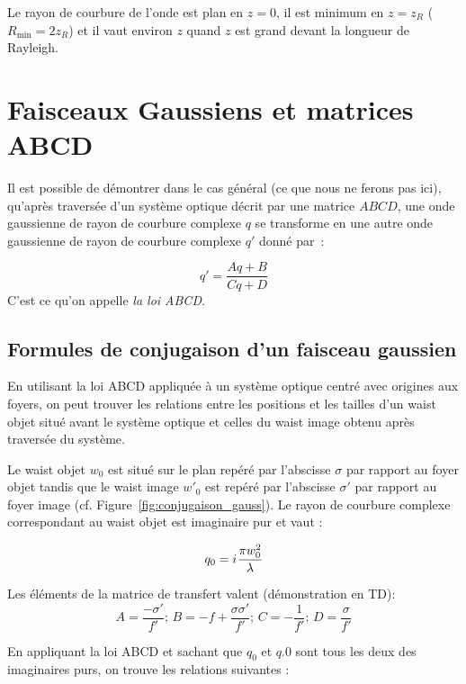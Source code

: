 \documentclass[a4paper]{book}
\newcommand{\iu}{{i\mkern1mu}}
\begin{document}
Le rayon de courbure de l'onde est plan en $z=0$, il est minimum en $z = z_R$ ($R_\textrm{min}=2z_R$) et il vaut environ $z$ quand $z$ est grand devant la longueur de Rayleigh.


\section{Faisceaux Gaussiens et matrices ABCD}

Il est possible de démontrer dans le cas général (ce que nous ne ferons pas ici), qu'après traversée d'un système optique décrit par une matrice $ABCD$, une onde gaussienne de rayon de courbure complexe $q$ se transforme en une autre onde gaussienne de rayon de courbure complexe $q'$ donné par~:

\begin{equation}
    q'=\frac{Aq+B}{Cq+D}
\end{equation}
C'est ce qu'on appelle \textit{la loi ABCD}.

\subsection{Formules de conjugaison d'un faisceau gaussien}

En utilisant la loi ABCD appliquée à un système optique centré avec origines aux foyers, on peut trouver les relations entre les positions et les tailles d'un waist objet situé avant le système optique et celles du waist image obtenu après traversée du système.


Le waist objet $w_0$ est situé sur le plan repéré par l'abscisse $\sigma$ par rapport au foyer objet tandis que le waist image $w'_0$ est repéré par l'abscisse $\sigma'$ par rapport au foyer image (cf. Figure~\ref{fig:conjugaison_gauss}). Le rayon de courbure complexe correspondant au waist objet est imaginaire pur et vaut :

\begin{equation}
    q_0=\iu \frac{\pi w_0^2}{\lambda}
\end{equation}

Les éléments de la matrice de transfert valent (démonstration en TD):
\begin{equation}
    A=\frac{-\sigma'}{f'};\,B=-f+\frac{\sigma \sigma'}{f'};\,C=-\frac{1}{f'};\,D=\frac{\sigma}{f'}
\end{equation}

En appliquant la loi ABCD et sachant que $q_0$ et $q_'0$ sont tous les deux des imaginaires purs, on trouve les relations suivantes :
\end{document}
